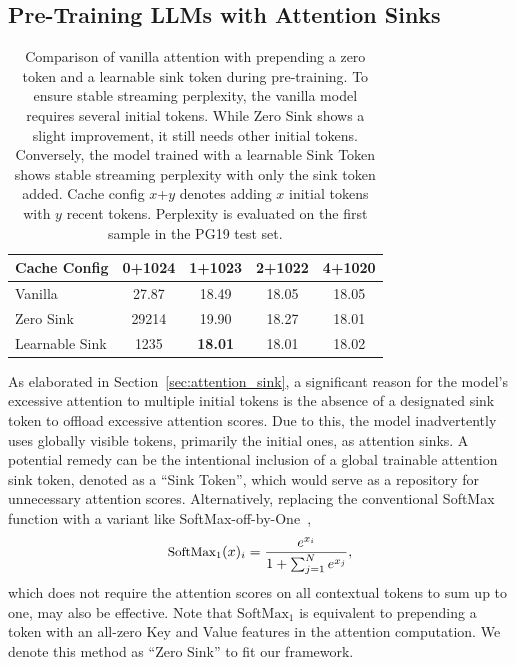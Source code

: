 \documentclass{article} \usepackage{iclr2024_conference,times}
\begin{document}
\subsection{Pre-Training LLMs with Attention Sinks}
\label{sec:pretrain-fix}
\begin{table}
\centering
\setlength{\tabcolsep}{2pt}
\small
\vspace{-2em}
\caption{\small Comparison of vanilla attention with prepending a zero token and a learnable sink token during pre-training. To ensure stable streaming perplexity, the vanilla model requires several initial tokens. While Zero Sink shows a slight improvement, it still needs other initial tokens. Conversely, the model trained with a learnable Sink Token shows stable streaming perplexity with only the sink token added. Cache config $x$+$y$ denotes adding $x$ initial tokens with $y$ recent tokens. Perplexity is evaluated on the first sample in the PG19 test set.}
\label{tab:pretrain_fix}
\begin{tabular}{lcccc}
\toprule
Cache Config     & 0+1024 & 1+1023 & 2+1022 & 4+1020  \\
\midrule
Vanilla        & 27.87                      & 18.49  & 18.05  & 18.05   \\
Zero Sink      & 29214                   & 19.90  & 18.27  & 18.01   \\
Learnable Sink & 1235                    & \textbf{18.01}  & 18.01  & 18.02   \\
\bottomrule
\end{tabular}
\end{table}
 
As elaborated in Section~\ref{sec:attention_sink}, a significant reason for the model's excessive attention to multiple initial tokens is the absence of a designated sink token to offload excessive attention scores. Due to this, the model inadvertently uses globally visible tokens, primarily the initial ones, as attention sinks. A potential remedy can be the intentional inclusion of a global trainable attention sink token, denoted as a ``Sink Token'', which would serve as a repository for unnecessary attention scores. Alternatively, replacing the conventional SoftMax function with a variant like SoftMax-off-by-One~\citep{softmax1}, 
\begin{equation}
    \small
    \text{SoftMax}_1(x)_i = \frac{e^{x_i}}{1+\sum_{j=1}^{N} e^{x_j}},
    \label{equ:softmax1}
\end{equation}
which does not require the attention scores on all contextual tokens to sum up to one, may also be effective. Note that $\text{SoftMax}_1$ is equivalent to prepending a token with an all-zero Key and Value features in the attention computation. We denote this method as ``Zero Sink'' to fit our framework.
\end{document}
